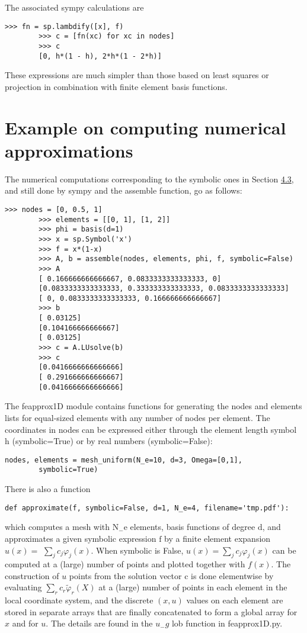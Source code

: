\documentclass[../main.tex]{subfiles}
\begin{document}
	The associated sympy calculations are
	\begin{lstlisting}[numbers=none]
		>>> fn = sp.lambdify([x], f)
		>>> c = [fn(xc) for xc in nodes]
		>>> c
		[0, h*(1 - h), 2*h*(1 - 2*h)]
	\end{lstlisting}
	These expressions are much simpler than those based on least squares or projection in combination with finite element basis functions.
	\section[Example on computing numerical approximations]{Example on computing numerical approximations}
	\label{sec:sec_4_5}
	The numerical computations corresponding to the symbolic ones in Section \hyperref[sec:sec_4_3]{4.3},
	and still done by sympy and the assemble function, go as follows:
	\begin{lstlisting}[numbers=none]
		>>> nodes = [0, 0.5, 1]
		>>> elements = [[0, 1], [1, 2]]
		>>> phi = basis(d=1)
		>>> x = sp.Symbol('x')
		>>> f = x*(1-x)
		>>> A, b = assemble(nodes, elements, phi, f, symbolic=False)
		>>> A
		[ 0.166666666666667, 0.0833333333333333, 0]
		[0.0833333333333333, 0.333333333333333, 0.0833333333333333]
		[ 0, 0.0833333333333333, 0.166666666666667]
		>>> b
		[ 0.03125]
		[0.104166666666667]
		[ 0.03125]
		>>> c = A.LUsolve(b)
		>>> c
		[0.0416666666666666]
		[ 0.291666666666667]
		[0.0416666666666666]	
	\end{lstlisting}
	The fe\textunderscore approx1D module contains functions for generating the nodes and
	elements lists for equal-sized elements with any number of nodes per element.
	The coordinates in nodes can be expressed either through the element length
	symbol h (symbolic=True) or by real numbers (symbolic=False):
	\begin{lstlisting}[numbers=none]
		nodes, elements = mesh_uniform(N_e=10, d=3, Omega=[0,1],
		symbolic=True)	
	\end{lstlisting}
	There is also a function
	\begin{lstlisting}[numbers=none]
		def approximate(f, symbolic=False, d=1, N_e=4, filename='tmp.pdf'):
	\end{lstlisting}
	which computes a mesh with $\mathrm{N}_{-}$e elements, basis functions of degree $\mathrm{d}$, and approximates a given symbolic expression $\mathrm{f}$ by a finite element expansion $u(x)=$ $\sum_{j} c_{j} \varphi_{j}(x)$. When symbolic is False, $u(x)=\sum_{j} c_{j} \varphi_{j}(x)$ can be computed at a (large) number of points and plotted together with $f(x)$. The construction of $u$ points from the solution vector $\mathrm{c}$ is done elementwise by evaluating $\sum_{r} c_{r} \tilde{\varphi}_{r}(X)$ at a (large) number of points in each element in the local coordinate system, and the discrete $(x, u)$ values on each element are stored in separate arrays that are finally concatenated to form a global array for $x$ and for $u$. The details are found in the $u_{-} g$ lob function in fe\textunderscore approx1D.py.
\end{document}
